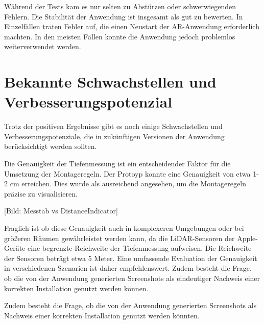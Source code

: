 Während der Tests kam es nur selten zu Abstürzen oder schwerwiegenden Fehlern. Die Stabilität der Anwendung ist insgesamt als gut zu bewerten. In Einzelfällen traten Fehler auf, die einen Neustart der AR-Anwendung erforderlich machten. In den meisten Fällen konnte die Anwendung jedoch problemlos weiterverwendet werden.

\section{Bekannte Schwachstellen und Verbesserungspotenzial}

Trotz der positiven Ergebnisse gibt es noch einige Schwachstellen und Verbesserungspotenziale, die in zukünftigen Versionen der Anwendung berücksichtigt werden sollten.

Die Genauigkeit der Tiefenmessung ist ein entscheidender Faktor für die Umsetzung der Montageregeln. Der Protoyp konnte eine Genauigkeit von etwa 1-2 cm erreichen. Dies wurde als ausreichend angesehen, um die Montageregeln präzise zu visualisieren. 

[Bild: Messtab vs DistanceIndicator]

Fraglich ist ob diese Genauigkeit auch in komplexeren Umgebungen oder bei größeren Räumen gewährleistet werden kann, da die LiDAR-Sensoren der Apple-Geräte eine begrenzte Reichweite der Tiefenmessung aufweisen. Die Reichweite der Sensoren beträgt etwa 5 Meter. Eine umfassende Evaluation der Genauigkeit in verschiedenen Szenarien ist daher empfehlenswert. Zudem besteht die Frage, ob die von der Anwendung generierten Screenshots als eindeutiger Nachweis einer korrekten Installation genutzt werden können. \cite{appledevdoc}

Zudem besteht die Frage, ob die von der Anwendung generierten Screenshots als Nachweis einer korrekten Installation genutzt werden könnten. 
